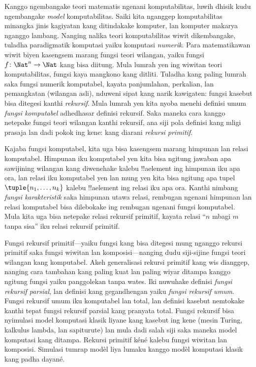 \documentclass[../../../include/open-logic-section]{subfiles}
\begin{document}

Kanggo ngembangake teori matematis ngenani komputabilitas, luwih dhisik
kudu ngembangake \emph{model} komputabilitas. Saiki kita nganggep
komputabilitas minangka jinis kagiyatan kang ditindakake komputer,
lan komputer makarya nganggo lambang. Nanging nalika teori
komputabilitas wiwit dikembangake, tuladha paradigmatik komputasi
yaiku komputasi \emph{numerik}. Para matematikawan wiwit biyen
kasengsem marang fungsi teori wilangan, yaiku fungsi
$f\colon \Nat^n \to
\Nat$ kang bisa diitung. Mula lumrah yen ing wiwitan teori
komputabilitas, fungsi kaya mangkono kang ditliti. Tuladha kang
paling lumrah saka fungsi numerik komputabel, kayata panjumlahan,
perkalian, lan pemangkatan (wilangan asli), nduweni sipat kang
narik kawigaten: fungsi kasebut bisa ditegesi kanthi
\emph{rekursif}. Mula lumrah yen kita nyoba menehi definisi umum
\emph{fungsi komputabel} adhedhasar definisi rekursif. Saka
maneka cara kanggo netepake fungsi teori wilangan kanthi rekursif,
ana siji pola definisi kang mligi prasaja lan dadi pokok ing kene:
kang diarani \emph{rekursi primitif}.

Kajaba fungsi komputabel, kita uga bisa kasengsem marang himpunan
lan relasi komputabel. Himpunan iku komputabel yen kita bisa ngitung
jawaban apa sawijining wilangan kang diwenehake kalebu
!!a{element} ing himpunan iku apa ora, lan relasi iku komputabel
yen lan mung yen kita bisa ngitung apa tupel
$\tuple{n_1, \dots, n_k}$ kalebu !!a{element} ing relasi iku
apa ora. Kanthi nimbang \emph{fungsi karakteristik} saka
himpunan utawa relasi, rembugan ngenani himpunan lan relasi
komputabel bisa dilebokake ing rembugan ngenani fungsi komputabel.
Mula kita uga bisa netepake relasi rekursif primitif, kayata
relasi “$n$ mbagi $m$ tanpa sisa” iku relasi rekursif primitif.

Fungsi rekursif primitif---yaiku fungsi kang bisa ditegesi mung
nganggo rekursi primitif saka fungsi wiwitan lan komposisi---nanging dudu siji-sijine fungsi teori
wilangan kang komputabel. Akeh generalisasi rekursi primitif
kang wis dianggep, nanging cara tambahan kang paling kuat lan
paling wiyar ditampa kanggo ngitung fungsi yaiku panggolekan
tanpa wates. Iki nuwuhake definisi \emph{fungsi rekursif
  parsial}, lan definisi kang gegandhengan yaiku \emph{fungsi
  rekursif umum}. Fungsi rekursif umum iku komputabel lan total,
lan definisi kasebut nemtokake kanthi tepat fungsi rekursif
parsial kang pranyata total. Fungsi rekursif bisa nyimulasi
model komputasi klasik liyane kang kasebut ing kene (mesin Turing, kalkulus lambda,
lan sapiturute) lan mula dadi salah siji saka maneka model
komputasi kang ditampa. Rekursi primitif kéné kalebu fungsi wiwitan lan komposisi. Simulasi tumrap modèl liya lumaku kanggo modèl komputasi klasik kang padha dayané.
\end{document}
